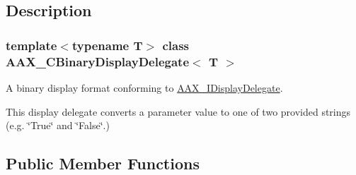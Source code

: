 \subsection{Description}
\subsubsection*{template$<$typename T$>$\newline
class A\+A\+X\+\_\+\+C\+Binary\+Display\+Delegate$<$ T $>$}

A binary display format conforming to \mbox{\hyperlink{a01801}{A\+A\+X\+\_\+\+I\+Display\+Delegate}}. 

This display delegate converts a parameter value to one of two provided strings (e.\+g. \char`\"{}\+True\char`\"{} and \char`\"{}\+False\char`\"{}.) \subsection*{Public Member Functions}
